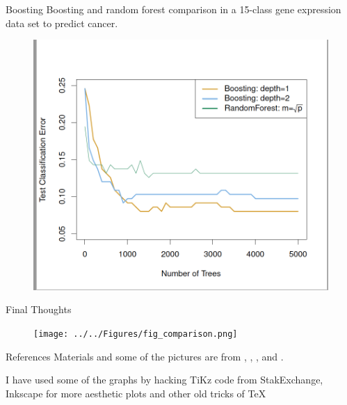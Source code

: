 \documentclass{beamer}
\begin{document}
\begin{frame}{Boosting}
	Boosting and random forest comparison in a 15-class gene expression data set to predict cancer.
	 \begin{figure}[h]
		\centering
		\includegraphics[scale=0.35]{../../Figures/fig_boosting.png}
	\end{figure}
	
\end{frame}

\begin{frame}{Final Thoughts}
	
 \begin{figure}[h]
	\centering
	\texttt{[image: ../../Figures/fig\_comparison.png]}
\end{figure}
\end{frame}

\begin{frame}{References}
	Materials and some of the pictures are from \citep{James2015}, \citep{genuer}, \citep{dubook}, and \citep{hastie01}.
	\printbibliography 	
	
	I have used some of the graphs by hacking TiKz code from StakExchange, Inkscape for more aesthetic plots and other old tricks of \TeX
	
\end{frame}
\end{document}
